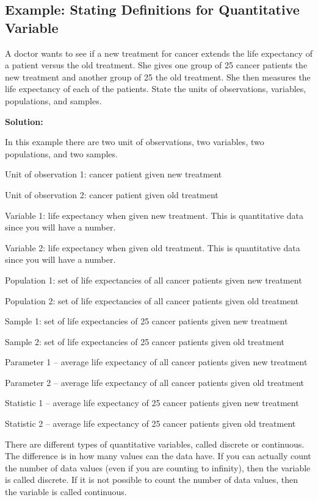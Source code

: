 \documentclass[
]{book}
\begin{document}
\hypertarget{example-stating-definitions-for-quantitative-variable-1}{%
\subsection{Example: Stating Definitions for Quantitative Variable}\label{example-stating-definitions-for-quantitative-variable-1}}

A doctor wants to see if a new treatment for cancer extends the life expectancy of a patient versus the old treatment. She gives one group of 25 cancer patients the new treatment and another group of 25 the old treatment. She then measures the life expectancy of each of the patients. State the units of observations, variables, populations, and samples.

\textbf{Solution:}

In this example there are two unit of observations, two variables, two populations, and two samples.

Unit of observation 1: cancer patient given new treatment

Unit of observation 2: cancer patient given old treatment

Variable 1: life expectancy when given new treatment. This is quantitative data since you will have a number.

Variable 2: life expectancy when given old treatment. This is quantitative data since you will have a number.

Population 1: set of life expectancies of all cancer patients given new treatment

Population 2: set of life expectancies of all cancer patients given old treatment

Sample 1: set of life expectancies of 25 cancer patients given new treatment

Sample 2: set of life expectancies of 25 cancer patients given old treatment

Parameter 1 -- average life expectancy of all cancer patients given new treatment

Parameter 2 -- average life expectancy of all cancer patients given old treatment

Statistic 1 -- average life expectancy of 25 cancer patients given new treatment

Statistic 2 -- average life expectancy of 25 cancer patients given old treatment

There are different types of quantitative variables, called discrete or continuous. The difference is in how many values can the data have. If you can actually count the number of data values (even if you are counting to infinity), then the variable is called discrete. If it is not possible to count the number of data values, then the variable is called continuous.
\end{document}

